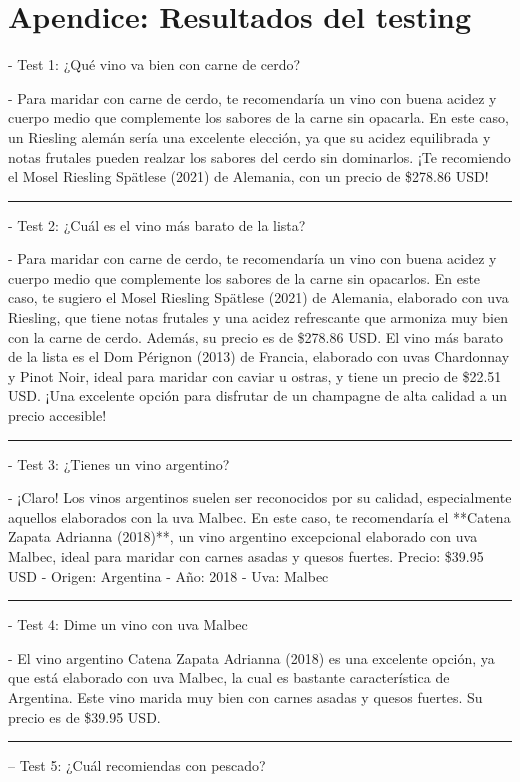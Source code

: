 \documentclass[conference]{IEEEtran}
\begin{document}
\section*{Apendice: Resultados del testing}
- Test 1: ¿Qué vino va bien con carne de cerdo?

- Para maridar con carne de cerdo, te recomendaría un vino con buena acidez y cuerpo medio que complemente los sabores de la carne sin opacarla. En este caso, un Riesling alemán sería una excelente elección, ya que su acidez equilibrada y notas frutales pueden realzar los sabores del cerdo sin dominarlos. ¡Te recomiendo el Mosel Riesling Spätlese (2021) de Alemania, con un precio de \$278.86 USD!
\vspace{0.1cm}
\hrule
\vspace{0.1cm}
- Test 2: ¿Cuál es el vino más barato de la lista?

- Para maridar con carne de cerdo, te recomendaría un vino con buena acidez y cuerpo medio que complemente los sabores de la carne sin opacarlos. En este caso, te sugiero el Mosel Riesling Spätlese (2021) de Alemania, elaborado con uva Riesling, que tiene notas frutales y una acidez refrescante que armoniza muy bien con la carne de cerdo. Además, su precio es de \$278.86 USD.
El vino más barato de la lista es el Dom Pérignon (2013) de Francia, elaborado con uvas Chardonnay y Pinot Noir, ideal para maridar con caviar u ostras, y tiene un precio de \$22.51 USD. ¡Una excelente opción para disfrutar de un champagne de alta calidad a un precio accesible!
\vspace{0.1cm}
\hrule
\vspace{0.1cm}
- Test 3: ¿Tienes un vino argentino?

- ¡Claro! Los vinos argentinos suelen ser reconocidos por su calidad, especialmente aquellos elaborados con la uva Malbec. En este caso, te recomendaría el **Catena Zapata Adrianna (2018)**, un vino argentino excepcional elaborado con uva Malbec, ideal para maridar con carnes asadas y quesos fuertes.
Precio: \$39.95 USD - Origen: Argentina - Año: 2018 - Uva: Malbec
\vspace{0.1cm}
\hrule
\vspace{0.1cm}
- Test 4: Dime un vino con uva Malbec

- El vino argentino Catena Zapata Adrianna (2018) es una excelente opción, ya que está elaborado con uva Malbec, la cual es bastante característica de Argentina. Este vino marida muy bien con carnes asadas y quesos fuertes. Su precio es de \$39.95 USD.
\vspace{0.1cm}
\hrule
\vspace{0.1cm}
-- Test 5: ¿Cuál recomiendas con pescado?
\end{document}
